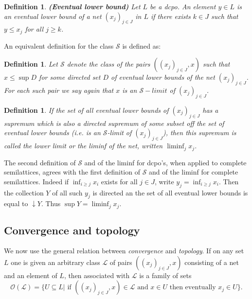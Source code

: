 \documentclass[a4paper,12pt]{article}
\newtheorem{definition}[theorem]{Definition}
\begin{document}
\begin{definition}\textbf{(Eventual lower bound)} Let $L$ be a dcpo. An element $y \in L$ is an \emph{eventual lower bound} of a net $(x_j)_{j\in J}$ in $L$ if there exists $k \in J$ such that $y \leq x_j$ for all $j \geq k$.
\end{definition}

An equivalent definition for the class $\mathcal{S}$ is defined as:

\begin{definition}
 Let $\mathcal{S}$ denote the class of the pairs $((x_j)_{j\in J}, x)$ such that $x \leq \sup D$ for some directed set $D$ of eventual lower bounds of the net $(x_j)_{j\in J}$. For each such pair we say again that $x$ is an $\mathcal{S}-limit$ of $(x_j)_{j \in J}$.
\end{definition}

\begin{definition}If the set of all eventual lower bounds of $(x_j)_{j\in J}$ has a supremum which is also a directed supremum of some subset off the set of eventual lower bounds (i.e. is an $\mathcal{S}$-limit of $(x_j)_{j\in J}$), then this supremum is called the \emph{lower limit} or the \emph{liminf} of the net, written $\liminf_j x_j$.
\end{definition}

The second definition of $\mathcal{S}$ and of the liminf for dcpo's, when applied to complete semilattices, agrees with the first definition of $\mathcal{S}$ and of the liminf for complete semilattices. Indeed if $\inf_{i \geq j}x_i$ exists for all $j \in J$, write $y_j = \inf_{i \geq j} x_i$. Then the collection $Y$ of all such $y_j$ is directed an the set of all eventual lower bounds is equal to $\downarrow Y$. Thus $\sup Y = \liminf_j x_j$.

\subsection{Convergence and topology}
We now use the general relation between \emph{convergence} and \emph{topology}. If on any set $L$ one is given an arbitrary class $\mathcal{L}$ of pairs $((x_j)_{j\in J}, x)$ consisting of a net and an element of $L$, then associated with $\mathcal{L}$ is a family of sets
$$\mathcal{O}(\mathcal{L}) = \{U \subseteq L | \text{ if } ((x_j)_{j\in J}, x) \in \mathcal{L} \text{ and } x \in U \text{ then eventually } x_j \in U\}.$$
\end{document}
